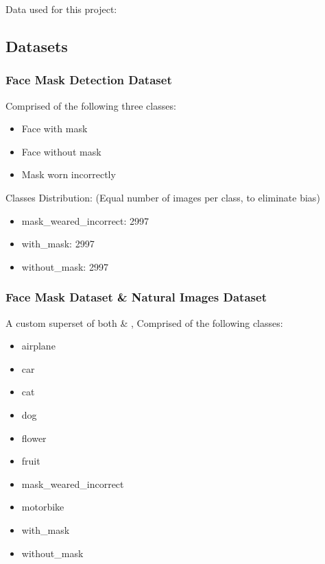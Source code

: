 Data used for this project:
\subsection{Datasets}
    \subsubsection{ \label{secondModel} Face Mask Detection Dataset \cite{face-mask-detection}}
        Comprised of the following three classes:
        \begin{itemize}
            \item Face with mask
            \item Face without mask
            \item Mask worn incorrectly
        \end{itemize}

        Classes Distribution: (Equal number of images per class, to eliminate bias)
        \begin{itemize}
            \item mask\_weared\_incorrect: 2997
            \item with\_mask: 2997
            \item without\_mask: 2997
        \end{itemize}


    \subsubsection{\label{firstModel} Face Mask Dataset \cite{face-mask-detection} \&  Natural Images Dataset \cite{natural-images}}
        A custom superset of both \cite{face-mask-detection} \&  \cite{natural-images}, Comprised of the following classes:
        \begin{itemize}
            \item airplane
            \item car
            \item cat
            \item dog
            \item flower
            \item fruit
            \item mask\_weared\_incorrect
            \item motorbike
            \item with\_mask
            \item without\_mask
        \end{itemize}

